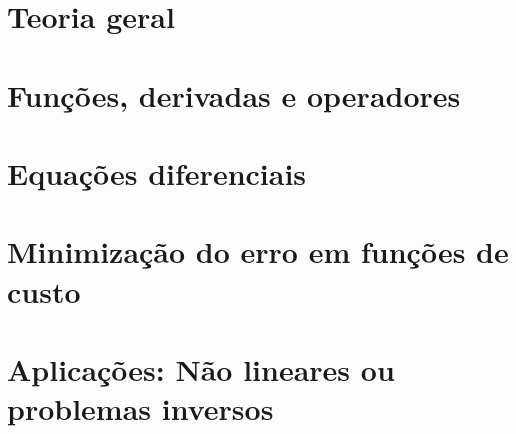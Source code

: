 \documentclass[12pt]{extbook} %
\def \SourceRootPath{.}
\begin{document}
\part{Teoria geral}



\part{Funções, derivadas e operadores}





\part{Equações diferenciais}


\part{Minimização do erro em funções de custo}




\part{Aplicações: Não lineares ou problemas inversos}



\end{document}

